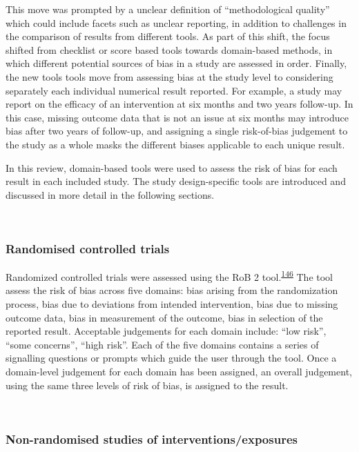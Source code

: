 \documentclass[a4paper, twoside]{templates/ociamthesis}
\begin{document}
This move was prompted by a unclear definition of ``methodological quality'' which could include facets such as unclear reporting, in addition to challenges in the comparison of results from different tools. As part of this shift, the focus shifted from checklist or score based tools towards domain-based methods, in which different potential sources of bias in a study are assessed in order.
Finally, the new tools tools move from assessing bias at the study level to considering separately each individual numerical result reported. For example, a study may report on the efficacy of an intervention at six months and two years follow-up. In this case, missing outcome data that is not an issue at six months may introduce bias after two years of follow-up, and assigning a single risk-of-bias judgement to the study as a whole masks the different biases applicable to each unique result.

In this review, domain-based tools were used to assess the risk of bias for each result in each included study. The study design-specific tools are introduced and discussed in more detail in the following sections.

~

\hypertarget{randomised-controlled-trials-1}{%
\subsubsection{Randomised controlled trials}\label{randomised-controlled-trials-1}}

Randomized controlled trials were assessed using the RoB 2 tool.\textsuperscript{\protect\hyperlink{ref-sterne2019}{146}} The tool assess the risk of bias across five domains: bias arising from the randomization process, bias due to deviations from intended intervention, bias due to missing outcome data, bias in measurement of the outcome, bias in selection of the reported result. Acceptable judgements for each domain include: ``low risk'', ``some concerns'', ``high risk''. Each of the five domains contains a series of signalling questions or prompts which guide the user through the tool. Once a domain-level judgement for each domain has been assigned, an overall judgement, using the same three levels of risk of bias, is assigned to the result.

~

\hypertarget{rob-tools-nrse}{%
\subsubsection{Non-randomised studies of interventions/exposures}\label{rob-tools-nrse}}
\end{document}

